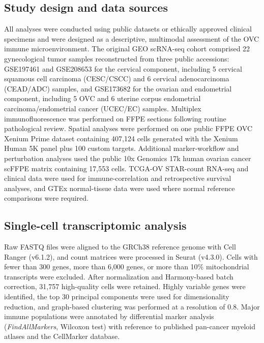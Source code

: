\documentclass[pdflatex,sn-vancouver-num]{sn-jnl}
\begin{document}
\subsection{Study design and data sources}
All analyses were conducted using public datasets or ethically approved clinical specimens and were designed as a descriptive, multimodal assessment of the OVC immune microenvironment. The original GEO scRNA-seq cohort comprised 22 gynecological tumor samples reconstructed from three public accessions: GSE197461 and GSE208653 for the cervical component, including 5 cervical squamous cell carcinoma (CESC/CSCC) and 6 cervical adenocarcinoma (CEAD/ADC) samples, and GSE173682 for the ovarian and endometrial component, including 5 OVC and 6 uterine corpus endometrial carcinoma/endometrial cancer (UCEC/EC) samples\cite{bib115,bib116,bib117}. Multiplex immunofluorescence was performed on FFPE sections following routine pathological review. Spatial analyses were performed on one public FFPE OVC Xenium Prime dataset containing 407,124 cells generated with the Xenium Human 5K panel plus 100 custom targets\cite{bib53,bib54,bib55}. Additional marker-workflow and perturbation analyses used the public 10x Genomics 17k human ovarian cancer scFFPE matrix containing 17,553 cells. TCGA-OV STAR-count RNA-seq and clinical data were used for immune-correlation and retrospective survival analyses, and GTEx normal-tissue data were used where normal reference comparisons were required\cite{bib58}.

\subsection{Single-cell transcriptomic analysis}
Raw FASTQ files were aligned to the GRCh38 reference genome with Cell Ranger (v6.1.2), and count matrices were processed in Seurat (v4.3.0)\cite{bib34,bib35,bib36}. Cells with fewer than 300 genes, more than 6,000 genes, or more than 10\% mitochondrial transcripts were excluded\cite{bib37,bib38}. After normalization and Harmony-based batch correction, 31,757 high-quality cells were retained. Highly variable genes were identified, the top 30 principal components were used for dimensionality reduction, and graph-based clustering was performed at a resolution of 0.8\cite{bib39,bib40,bib41,bib42,bib43}. Major immune populations were annotated by differential marker analysis (\textit{FindAllMarkers}, Wilcoxon test) with reference to published pan-cancer myeloid atlases and the CellMarker database\cite{bib21,bib44}.
\end{document}
